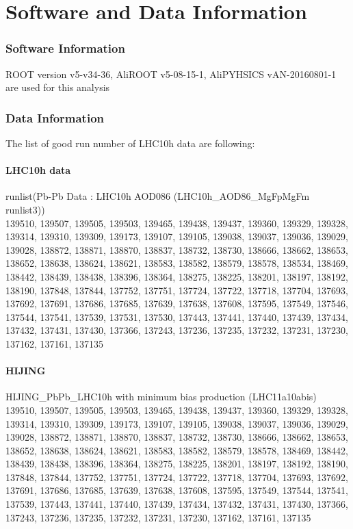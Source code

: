 \newpage
\chapter{Software and Data Information}


\subsection{Software Information}
ROOT version v5-v34-36, AliROOT v5-08-15-1, AliPYHSICS vAN-20160801-1 are used for this analysis


\subsection{Data Information}
\label{DataInfo}
The list of good run number of LHC10h data are following:

\subsubsection{LHC10h data}
runlist(Pb-Pb Data : LHC10h AOD086 (LHC10h\_AOD86\_MgFpMgFm runlist3)) \\ 

139510, 139507, 139505, 139503, 139465, 139438, 139437, 139360, 139329, 139328, 139314, 139310, 139309, 139173, 139107, 139105, 139038, 139037, 139036, 139029, 139028, 138872, 138871, 138870, 138837, 138732, 138730, 138666, 138662, 138653, 138652, 138638, 138624, 138621, 138583, 138582, 138579, 138578, 138534, 138469, 138442, 138439, 138438, 138396, 138364, 138275, 138225, 138201, 138197, 138192, 138190, 137848, 137844, 137752, 137751, 137724, 137722, 137718, 137704, 137693, 137692, 137691, 137686, 137685, 137639, 137638, 137608, 137595, 137549, 137546, 137544, 137541, 137539, 137531, 137530, 137443, 137441, 137440, 137439, 137434, 137432, 137431, 137430, 137366, 137243, 137236, 137235, 137232, 137231, 137230, 137162, 137161, 137135

\subsubsection{HIJING} 

HIJING\_PbPb\_LHC10h with minimum bias production (LHC11a10abis) \\ 

139510, 139507, 139505, 139503, 139465, 139438, 139437, 139360, 139329, 139328, 139314, 139310, 139309, 139173, 139107, 139105, 139038, 139037, 139036, 139029, 139028, 138872, 138871, 138870, 138837, 138732, 138730, 138666, 138662, 138653, 138652, 138638, 138624, 138621, 138583, 138582, 138579, 138578, 138469, 138442, 138439, 138438, 138396, 138364, 138275, 138225, 138201, 138197, 138192, 138190, 137848, 137844, 137752, 137751, 137724, 137722, 137718, 137704, 137693, 137692, 137691, 137686, 137685, 137639, 137638, 137608, 137595, 137549, 137544, 137541, 137539, 137443, 137441, 137440, 137439, 137434, 137432, 137431, 137430, 137366, 137243, 137236, 137235, 137232, 137231, 137230, 137162, 137161, 137135


